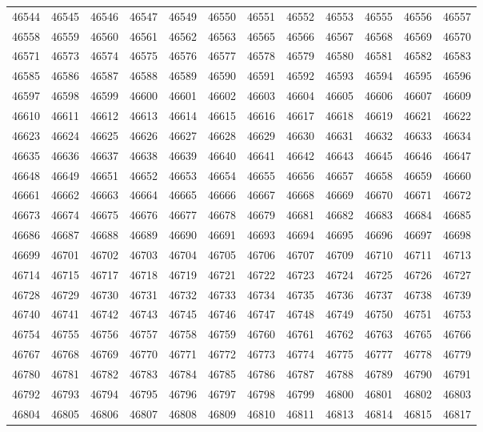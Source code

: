\begin{center}
\begin{longtable}{llllllllllll}
46544 &46545 &46546 &46547 &46549 &46550 &46551 &46552 &46553 &46555 &46556 &46557 \\
46558 &46559 &46560 &46561 &46562 &46563 &46565 &46566 &46567 &46568 &46569 &46570 \\
46571 &46573 &46574 &46575 &46576 &46577 &46578 &46579 &46580 &46581 &46582 &46583 \\
46585 &46586 &46587 &46588 &46589 &46590 &46591 &46592 &46593 &46594 &46595 &46596 \\
46597 &46598 &46599 &46600 &46601 &46602 &46603 &46604 &46605 &46606 &46607 &46609 \\
46610 &46611 &46612 &46613 &46614 &46615 &46616 &46617 &46618 &46619 &46621 &46622 \\
46623 &46624 &46625 &46626 &46627 &46628 &46629 &46630 &46631 &46632 &46633 &46634 \\
46635 &46636 &46637 &46638 &46639 &46640 &46641 &46642 &46643 &46645 &46646 &46647 \\
46648 &46649 &46651 &46652 &46653 &46654 &46655 &46656 &46657 &46658 &46659 &46660 \\
46661 &46662 &46663 &46664 &46665 &46666 &46667 &46668 &46669 &46670 &46671 &46672 \\
46673 &46674 &46675 &46676 &46677 &46678 &46679 &46681 &46682 &46683 &46684 &46685 \\
46686 &46687 &46688 &46689 &46690 &46691 &46693 &46694 &46695 &46696 &46697 &46698 \\
46699 &46701 &46702 &46703 &46704 &46705 &46706 &46707 &46709 &46710 &46711 &46713 \\
46714 &46715 &46717 &46718 &46719 &46721 &46722 &46723 &46724 &46725 &46726 &46727 \\
46728 &46729 &46730 &46731 &46732 &46733 &46734 &46735 &46736 &46737 &46738 &46739 \\
46740 &46741 &46742 &46743 &46745 &46746 &46747 &46748 &46749 &46750 &46751 &46753 \\
46754 &46755 &46756 &46757 &46758 &46759 &46760 &46761 &46762 &46763 &46765 &46766 \\
46767 &46768 &46769 &46770 &46771 &46772 &46773 &46774 &46775 &46777 &46778 &46779 \\
46780 &46781 &46782 &46783 &46784 &46785 &46786 &46787 &46788 &46789 &46790 &46791 \\
46792 &46793 &46794 &46795 &46796 &46797 &46798 &46799 &46800 &46801 &46802 &46803 \\
46804 &46805 &46806 &46807 &46808 &46809 &46810 &46811 &46813 &46814 &46815 &46817 \\

\end{longtable}
\end{center}

